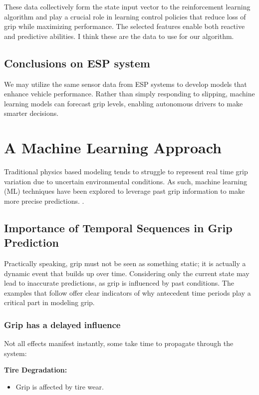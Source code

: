 \documentclass[a4paper,final,12pt]{report}
\begin{document}
These data collectively form the state input vector to the reinforcement learning algorithm and play a crucial role in learning control policies that reduce loss of grip while maximizing performance. The selected features enable both reactive and predictive abilities. I think these are the data to use for our algorithm.

\subsection{Conclusions on ESP system}
We may utilize the same sensor data from ESP systems to develop models that enhance vehicle performance. Rather than simply responding to slipping, machine learning models can forecast grip levels, enabling  autonomous drivers to make smarter decisions.

\section{A Machine Learning Approach}
Traditional physics based modeling tends to struggle to represent real time grip variation due to uncertain environmental conditions. As such, machine learning (ML) techniques have been explored to leverage past grip information to make more precise predictions. \cite{Pacejka2012}.

\subsection{Importance of Temporal Sequences in Grip Prediction}
Practically speaking, grip must not be seen as something static; it is actually a dynamic event that builds up over time. Considering only the current state may lead to inaccurate predictions, as grip is influenced by past conditions. The examples that follow offer clear indicators of why antecedent time periods play a critical part in modeling grip.

\newpage

\subsubsection{Grip has a delayed influence}
Not all effects manifest instantly, some take time to propagate through the system:

\textbf{Tire Degradation:}
\begin{itemize}
    \item Grip is affected by tire wear.
\end{itemize}
\end{document}
